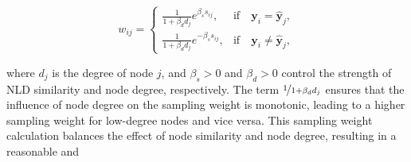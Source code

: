 \documentclass[letterpaper]{article} %
\newcommand{\aVec}[1]{\mathbf{#1}}
\begin{document}
\begin{small}
	\begin{equation}
	w_{ij} =
	\begin{cases}
	\frac{1}{1 + \beta_{d}d_{j}}e^{\beta_{s} s_{ij}}, & \text{if} \quad \aVec{y}_{i} = \hat{\aVec{y}}_{j}, \\
   \frac{1}{1 + \beta_{d}d_{j}}e^{-\beta_{s} s_{ij}}, & \text{if} \quad \aVec{y}_{i} \neq \hat{\aVec{y}}_{j},
	\end{cases}
\end{equation}
\end{small}where $d_{j}$ is the degree of node $j$, and $\beta_{s} > 0$ and $\beta_{d} > 0$ control the strength of NLD similarity and node degree, respectively. The term $\nicefrac{1}{1 + \beta_{d}d_{j}}$ ensures that the influence of node degree on the sampling weight is monotonic, leading to a higher sampling weight for low-degree nodes and vice versa. This sampling weight calculation balances the effect of node similarity and node degree, resulting in a reasonable and
\end{document}
